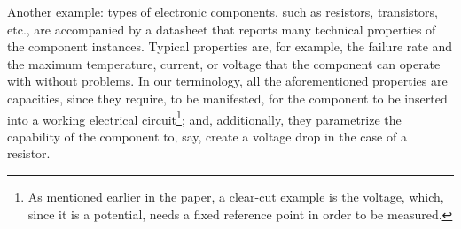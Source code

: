 \documentclass[sw]{iosart2x}
\newcommand{\myComment}[1]{{\unskip \ignorespaces}}
\begin{document}
Another example: types of electronic components, such as resistors, transistors, etc., are accompanied by a datasheet that reports many technical properties of the component instances. 
Typical properties are, for example, the failure rate and the maximum temperature, current, or voltage that the component can operate with without problems. 
In our terminology, all the aforementioned properties are capacities, since they require, to be manifested, for the component to be inserted into a working electrical circuit\footnote{As mentioned earlier in the paper, a clear-cut example is the voltage, which, since it is a potential, needs a fixed reference point in order to be measured.}; and, additionally, they \myComment{quantify} parametrize the capability of the component to, say, create a voltage drop in the case of a resistor. 
\end{document}
